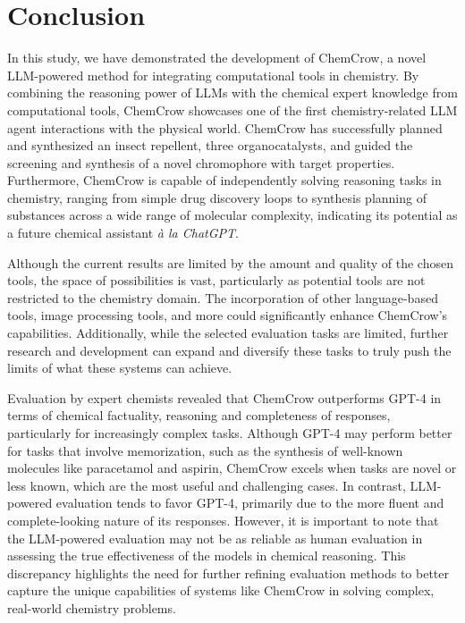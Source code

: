 \documentclass[10pt]{article}
\begin{document}
\section{Conclusion}
In this study, we have demonstrated the development of ChemCrow, a novel LLM-powered method for integrating computational tools in chemistry. By combining the reasoning power of LLMs with the chemical expert knowledge from computational tools, ChemCrow showcases one of the first chemistry-related LLM agent interactions with the physical world. ChemCrow has successfully planned and synthesized an insect repellent, three organocatalysts, and guided the screening and synthesis of a novel chromophore with target properties. Furthermore, ChemCrow is capable of independently solving reasoning tasks in chemistry, ranging from simple drug discovery loops to synthesis planning of substances across a wide range of molecular complexity, indicating its potential as a future chemical assistant \textit{à la ChatGPT}.

Although the current results are limited by the amount and quality of the chosen tools, the space of possibilities is vast, particularly as potential tools are not restricted to the chemistry domain. The incorporation of other language-based tools, image processing tools, and more could significantly enhance ChemCrow's capabilities. Additionally, while the selected evaluation tasks are limited, further research and development can expand and diversify these tasks to truly push the limits of what these systems can achieve.


Evaluation by expert chemists revealed that ChemCrow outperforms GPT-4 in terms of chemical factuality, reasoning and completeness of responses, particularly for increasingly complex tasks. Although GPT-4 may perform better for tasks that involve memorization, such as the synthesis of well-known molecules like paracetamol and aspirin, ChemCrow excels when tasks are novel or less known, which are the most useful and challenging cases. In contrast, LLM-powered evaluation tends to favor GPT-4, primarily due to the more fluent and complete-looking nature of its responses. However, it is important to note that the LLM-powered evaluation may not be as reliable as human evaluation in assessing the true effectiveness of the models in chemical reasoning. This discrepancy highlights the need for further refining evaluation methods to better capture the unique capabilities of systems like ChemCrow in solving complex, real-world chemistry problems.
\end{document}
